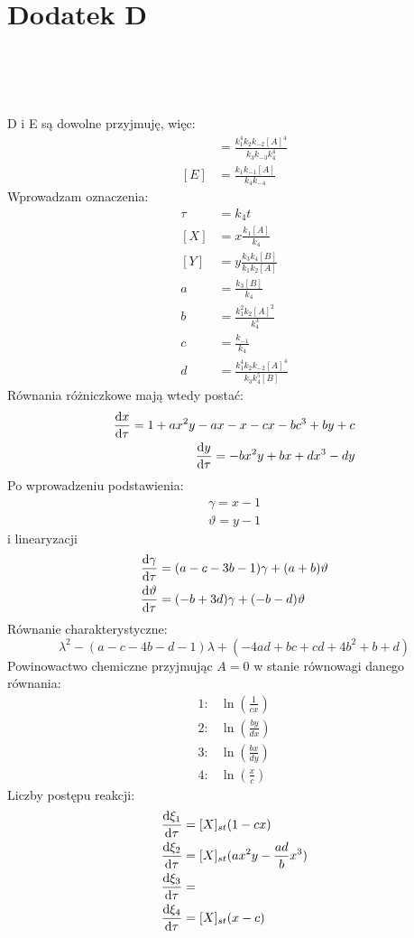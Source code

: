 \documentclass[10pt, a4paper, twoside, onecolumn]{article}
\numberwithin{equation}{section}
\begin{document}
	\section{Dodatek D}
	\begin{center}
		 \\
		 \\
		 \\
	\end{center}
	D i E są dowolne przyjmuję, więc:
	\begin{align}
		[D] &= \frac{k_{1}^{4}k_{2}k_{-2}[A]^{4}}{k_{3}k_{-3}k_{4}^{4}} \\
		[E] &= \frac{k_{1}k_{-1}[A]}{k_{4}k_{-4}}
	\end{align}
	Wprowadzam oznaczenia: 
	\begin{align}
		\tau &= k_{4}t \\
		[X] &= x\frac{k_{1}[A]}{k_{4}} \\
		[Y] &= y\frac{k_{3}k_{4}[B]}{k_{1}k_{2}[A]} \\
		a &= \frac{k_{3}[B]}{k_{4}} \\
		b &= \frac{k_{1}^{2}k_{2}[A]^{2}}{k_{4}^{3}} \\
		c &= \frac{k_{-1}}{k_{4}} \\
		d &= \frac{k_{1}^{4}k_{2}k_{-2}[A]^{4}}{k_{3}k_{4}^{5}[B]}
	\end{align}
	Równania różniczkowe mają wtedy postać:
	\begin{align}
		\dv{x}{\tau} = 1 + ax^{2}y - ax - x - cx - bc^{3} + by + c \\
		\dv{y}{\tau} = -bx^{2}y + bx + dx^{3} - dy
	\end{align}
	Po wprowadzeniu podstawienia:
	\begin{gather*}
		\gamma = x - 1 \\
		\vartheta = y - 1
	\end{gather*}
	i linearyzacji
	\begin{align}
		\dv{\gamma}{\tau} &= (a - c - 3b - 1)\gamma + (a + b)\vartheta \\
		\dv{\vartheta}{\tau} &= (- b + 3d)\gamma + (- b - d)\vartheta
	\end{align}
	Równanie charakterystyczne:
	\begin{equation}
		\lambda^{2} - (a - c - 4b - d - 1)\lambda + (-4ad + bc + cd + 4b^{2} + b + d)
	\end{equation}
	Powinowactwo chemiczne przyjmując \(A=0\) w stanie równowagi danego równania:
	\begin{align}
		1: & \ln(\frac{1}{cx}) \\
		2: & \ln(\frac{by}{dx}) \\
		3: & \ln(\frac{bx}{dy}) \\
		4: & \ln(\frac{x}{c})
	\end{align}
	Liczby postępu reakcji:
	\begin{align}
		\dv{\xi_{1}}{\tau} &= [X]_{st}(1 - cx) \\
		\dv{\xi_{2}}{\tau} &= [X]_{st}(ax^{2}y - \frac{ad}{b}x^{3}) \\
		\dv{\xi_{3}}{\tau} &= \\
		\dv{\xi_{4}}{\tau} &= [X]_{st}(x - c)
	\end{align}
\end{document}
